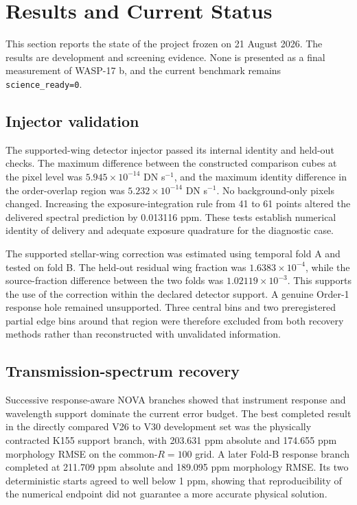 \section{Results and Current Status}
\label{sec:results}

This section reports the state of the project frozen on 21 August 2026. The
results are development and screening evidence. None is presented as a final
measurement of WASP-17 b, and the current benchmark remains
\texttt{science\_ready=0}.

\subsection{Injector validation}

The supported-wing detector injector passed its internal identity and held-out
checks. The maximum difference between the constructed comparison cubes at the
pixel level was $5.945\times10^{-14}$ DN s$^{-1}$, and the maximum identity
difference in the order-overlap region was $5.232\times10^{-14}$ DN s$^{-1}$.
No background-only pixels changed. Increasing the exposure-integration rule from
41 to 61 points altered the delivered spectral prediction by 0.013116 ppm. These
tests establish numerical identity of delivery and adequate exposure quadrature
for the diagnostic case.

The supported stellar-wing correction was estimated using temporal fold A and
tested on fold B. The held-out residual wing fraction was $1.6383\times10^{-4}$,
while the source-fraction difference between the two folds was
$1.02119\times10^{-3}$. This supports the use of the correction within the
declared detector support. A genuine Order-1 response hole remained unsupported.
Three central bins and two preregistered partial edge bins around that region
were therefore excluded from both recovery methods rather than reconstructed
with unvalidated information.

\subsection{Transmission-spectrum recovery}

Successive response-aware NOVA branches showed that instrument response and
wavelength support dominate the current error budget. The best completed result
in the directly compared V26 to V30 development set was the physically contracted
K155 support branch, with 203.631 ppm absolute and 174.655 ppm morphology RMSE on
the common-$R=100$ grid. A later Fold-B response branch completed at 211.709 ppm
absolute and 189.095 ppm morphology RMSE. Its two deterministic starts agreed to
well below 1 ppm, showing that reproducibility of the numerical endpoint did not
guarantee a more accurate physical solution.

